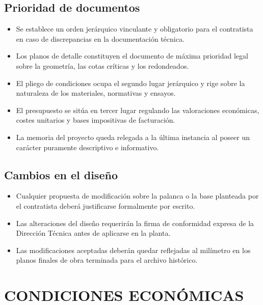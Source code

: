 \documentclass[11pt,a4paper]{article}
\begin{document}
\subsection{Prioridad de documentos}
\begin{itemize}
    \item Se establece un orden jerárquico vinculante y obligatorio para el contratista en caso de discrepancias en la documentación técnica.
    \item Los planos de detalle constituyen el documento de máxima prioridad legal sobre la geometría, las cotas críticas y los redondeados.
    \item El pliego de condiciones ocupa el segundo lugar jerárquico y rige sobre la naturaleza de los materiales, normativas y ensayos.
    \item El presupuesto se sitúa en tercer lugar regulando las valoraciones económicas, costes unitarios y bases impositivas de facturación.
    \item La memoria del proyecto queda relegada a la última instancia al poseer un carácter puramente descriptivo e informativo.
\end{itemize}

\subsection{Cambios en el diseño}
\begin{itemize}
    \item Cualquier propuesta de modificación sobre la palanca o la base planteada por el contratista deberá justificarse formalmente por escrito.
    \item Las alteraciones del diseño requerirán la firma de conformidad expresa de la Dirección Técnica antes de aplicarse en la planta.
    \item Las modificaciones aceptadas deberán quedar reflejadas al milímetro en los planos finales de obra terminada para el archivo histórico.
\end{itemize}

\section{CONDICIONES ECONÓMICAS}
\end{document}
